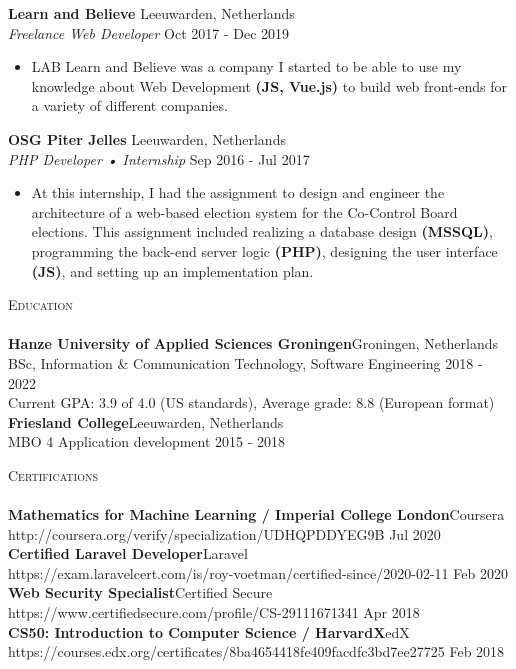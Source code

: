 \documentclass[a4paper]{article}
\newcommand{\lineunder} {
    \vspace*{-8pt} \\
    \hspace*{-18pt} \hrulefill \\
}
\newcommand{\header} [1] {
    {\hspace*{-18pt}\vspace*{6pt} \textsc{#1}}
    \vspace*{-6pt} \lineunder
}
\begin{document}
\textbf{Learn and Believe} \hfill Leeuwarden, Netherlands\\
\textit{Freelance Web Developer} \hfill Oct 2017 - Dec 2019\\
\vspace{-1mm}
\begin{itemize} \itemsep 1pt
	\item LAB Learn and Believe was a company I started to be able to use my knowledge about Web Development \textbf{(JS, Vue.js)} to build web front-ends for a variety of different companies.
\end{itemize}
\textbf{OSG Piter Jelles} \hfill Leeuwarden, Netherlands\\
\textit{PHP Developer • Internship} \hfill Sep 2016 - Jul 2017\\
\vspace{-1mm}
\begin{itemize} \itemsep 1pt
	\item At this internship, I had the assignment to design and engineer the architecture of a web-based election system for the Co-Control Board elections. This assignment included realizing a database design \textbf{(MSSQL)}, programming the back-end server logic \textbf{(PHP)}, designing the user interface \textbf{(JS)}, and setting up an implementation plan.
\end{itemize}

\header{Education}
\textbf{Hanze University of Applied Sciences Groningen}\hfill Groningen, Netherlands\\
BSc, Information \& Communication Technology, Software Engineering \hfill 2018 - 2022\\
Current GPA: 3.9 of 4.0 (US standards), Average grade: 8.8 (European format)\\
\vspace{2mm}
\textbf{Friesland College}\hfill Leeuwarden, Netherlands\\
MBO 4 Application development \hfill 2015 - 2018\\
\vspace{2mm}

\header{Certifications}
\textbf{Mathematics for Machine Learning / Imperial College London}\hfill Coursera\\
http://coursera.org/verify/specialization/UDHQPDDYEG9B \hfill Jul 2020\\
\vspace{2mm}
\textbf{Certified Laravel Developer}\hfill Laravel\\
https://exam.laravelcert.com/is/roy-voetman/certified-since/2020-02-11 \hfill Feb 2020\\
\vspace{2mm}
\textbf{Web Security Specialist}\hfill Certified Secure\\
https://www.certifiedsecure.com/profile/CS-29111671341 \hfill Apr 2018\\
\vspace{2mm}
\textbf{CS50: Introduction to Computer Science / HarvardX}\hfill edX\\
https://courses.edx.org/certificates/8ba4654418fe409facdfc3bd7ee27725 \hfill Feb 2018\\
\vspace{2mm}
\end{document}
